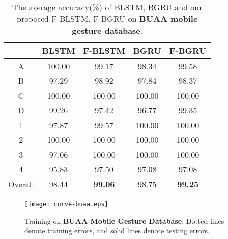 \documentclass[review]{elsarticle}
\begin{document}
\begin{table*}
	\centering
	\caption{The average accuracy(\%) of BLSTM, BGRU and our proposed F-BLSTM, F-BGRU on \textbf{BUAA mobile gesture database}.}
	\label{table:buaadatabase}
	\vspace*{6pt}
	\begin{tabular}{||c||c|c||c|c||}
		\hline
		\diagbox{\textbf{Gesture}}{\textbf{Method}} & BLSTM & F-BLSTM & BGRU & F-BGRU\\
		\hline
		A & 100.00 & 99.17  & 98.34  & 99.58 \\ %
		B & 97.29  & 98.92 & 97.84  & 98.37 \\ %
		C & 100.00 & 100.00 & 100.00 & 100.00 \\ %
		D & 99.26  & 97.42  & 96.77  & 99.35 \\ %
		1 & 97.87  & 99.57  & 100.00 & 100.00 \\ %
		2 & 100.00 & 100.00 & 100.00 & 100.00 \\ %
		3 & 97.06  & 100.00 & 100.00 & 100.00 \\ %
		4 & 95.83  & 97.50  & 97.08  & 97.08 \\ \hline
		Overall & 98.44 & \textbf{99.06} & 98.75 & \textbf{99.25} \\ \hline
	\end{tabular}
\end{table*}

\begin{figure*}[htbp]
	\normalsize
	\centering
	\texttt{[image: curve-buaa.eps]}
	\caption{Training on \textbf{BUAA Mobile Gesture Database}. Dotted lines denote training errors, and solid lines denote testing errors. }
	\label{fig:curve-buaa}
	\vspace*{4pt}
\end{figure*}
\end{document}
